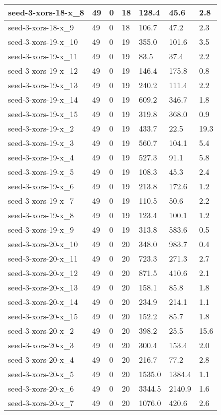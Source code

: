 \begin{scriptsize}
\begin{longtable}{|p{5cm}|l|l|l|l|l|l|}
seed-3-xors-18-x\_8&49&0&18&128.4&45.6&2.8 \\ \hline 
seed-3-xors-18-x\_9&49&0&18&106.7&47.2&2.3 \\ \hline 
seed-3-xors-19-x\_10&49&0&19&355.0&101.6&3.5 \\ \hline 
seed-3-xors-19-x\_11&49&0&19&83.5&37.4&2.2 \\ \hline 
seed-3-xors-19-x\_12&49&0&19&146.4&175.8&0.8 \\ \hline 
seed-3-xors-19-x\_13&49&0&19&240.2&111.4&2.2 \\ \hline 
seed-3-xors-19-x\_14&49&0&19&609.2&346.7&1.8 \\ \hline 
seed-3-xors-19-x\_15&49&0&19&319.8&368.0&0.9 \\ \hline 
seed-3-xors-19-x\_2&49&0&19&433.7&22.5&19.3 \\ \hline 
seed-3-xors-19-x\_3&49&0&19&560.7&104.1&5.4 \\ \hline 
seed-3-xors-19-x\_4&49&0&19&527.3&91.1&5.8 \\ \hline 
seed-3-xors-19-x\_5&49&0&19&108.3&45.3&2.4 \\ \hline 
seed-3-xors-19-x\_6&49&0&19&213.8&172.6&1.2 \\ \hline 
seed-3-xors-19-x\_7&49&0&19&110.5&50.6&2.2 \\ \hline 
seed-3-xors-19-x\_8&49&0&19&123.4&100.1&1.2 \\ \hline 
seed-3-xors-19-x\_9&49&0&19&313.8&583.6&0.5 \\ \hline 
seed-3-xors-20-x\_10&49&0&20&348.0&983.7&0.4 \\ \hline 
seed-3-xors-20-x\_11&49&0&20&723.3&271.3&2.7 \\ \hline 
seed-3-xors-20-x\_12&49&0&20&871.5&410.6&2.1 \\ \hline 
seed-3-xors-20-x\_13&49&0&20&158.1&85.8&1.8 \\ \hline 
seed-3-xors-20-x\_14&49&0&20&234.9&214.1&1.1 \\ \hline 
seed-3-xors-20-x\_15&49&0&20&152.2&85.7&1.8 \\ \hline 
seed-3-xors-20-x\_2&49&0&20&398.2&25.5&15.6 \\ \hline 
seed-3-xors-20-x\_3&49&0&20&300.4&153.4&2.0 \\ \hline 
seed-3-xors-20-x\_4&49&0&20&216.7&77.2&2.8 \\ \hline 
seed-3-xors-20-x\_5&49&0&20&1535.0&1384.4&1.1 \\ \hline 
seed-3-xors-20-x\_6&49&0&20&3344.5&2140.9&1.6 \\ \hline 
seed-3-xors-20-x\_7&49&0&20&1076.0&420.6&2.6 \\ \hline 

\end{longtable}
\end{scriptsize}
